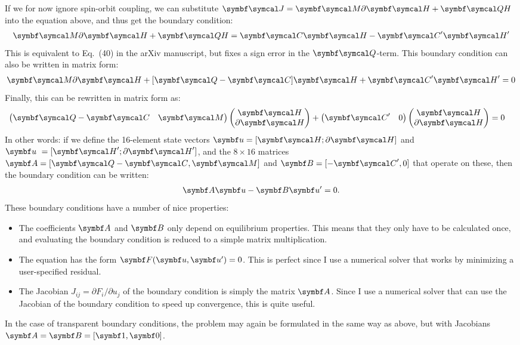 If we for now ignore spin-orbit coupling, we can substitute $\BC{J} = \BC{M}\partial\BC{H} + \BC{QH}$ into the equation above, and thus get the boundary condition:
\begin{align}
  \BC{M}\partial\BC{H} + \BC{QH} = \BC{C} \BC{H} - \BC{C}'\BC{H}'
\end{align}
This is equivalent to Eq.~(40) in the arXiv manuscript, but fixes a sign error in the $\BC{Q}$-term. 
This boundary condition can also be written in matrix form:
\begin{align}
  \BC{M}\partial\BC{H} + [\BC{Q}-\BC{C}]\BC{H} + \BC{C}'\BC{H}' = 0
\end{align}
Finally, this can be rewritten in matrix form as:
\begin{align}
  \begin{pmatrix}
    \BC{Q}-\BC{C} & \BC{M} \\
  \end{pmatrix}
  \begin{pmatrix}
    \BC{H} \\
    \partial\BC{H}
  \end{pmatrix}
  +
  \begin{pmatrix}
    \BC{C}' & 0 \\
  \end{pmatrix}
  \begin{pmatrix}
    \BC{H} \\
    \partial\BC{H}
  \end{pmatrix}
  &= 0
\end{align}
In other words: if we define the 16-element state vectors $\B{u} = [\BC{H}; \partial\BC{H}]$ and $\B{u}\ = [\BC{H}'; \partial\BC{H}']$, and the $8\times16$ matrices $\B{A} = [\BC{Q}-\BC{C}, \BC{M} ]$ and $\B{B} = [-\BC{C}', 0]$ that operate on these, then the boundary condition can be written:
\begin{align}
  \B{A}\B{u} - \B{B}\B{u}' = 0 .
\end{align}
\clearpage
These boundary conditions have a number of nice properties:
\begin{itemize}
  \item 
    The coefficients $\B{A}$ and $\B{B}$ only depend on equilibrium properties.
    This means that they only have to be calculated once, and evaluating the boundary condition is reduced to a simple matrix multiplication.
  \item 
    The equation has the form $\B{F}(\B{u},\B{u}') = 0$.
    This is perfect since I use a numerical solver that works by minimizing a user-specified residual.
  \item
    The Jacobian $J_{ij} = \partial F_i/\partial u_j$ of the boundary condition is simply the matrix $\B{A}$.
    Since I use a numerical solver that can use the Jacobian of the boundary condition to speed up convergence, this is quite useful.
\end{itemize}
In the case of transparent boundary conditions, the problem may again be formulated in the same way as above, but with Jacobians $\B{A} = \B{B} = [\B{1},\B{0}]$.
